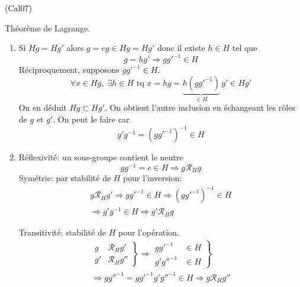 \begin{tiny}(Cal07)\end{tiny} Théorème de Lagrange.
\begin{enumerate}
  \item Si $Hg = Hg'$ alors $g=eg\in Hg=Hg'$ donc il existe $h\in H$ tel que
\begin{displaymath}
  g = h g' \Rightarrow gg'^{-1} \in H
\end{displaymath}
Réciproquement, supposons $gg'^{-1} \in H$.
\begin{displaymath}
  \forall x \in Hg,\; \exists h\in H\text{ tq } x = hg = \underset{\in H}{\underbrace{h(gg'^{-1})}}\,g' \in Hg'
\end{displaymath}
On en déduit $Hg \subset Hg'$.\newline
On obtient l'autre inclusion en échangeant les rôles de $g$ et $g'$. On peut le faire car 
\begin{displaymath}
  g'g^{-1} = (gg'^{-1})^{-1} \in H
\end{displaymath}

  \item Réflexivité: un sous-groupe contient le neutre
\begin{displaymath}
gg^{-1}=e\in H  \Rightarrow g \mathcal{R}_H g
\end{displaymath}
Symétrie: par stabilité de $H$ pour l'inversion:
\begin{multline*}
g \mathcal{R}_H g' \Rightarrow gg'^{-1} \in H \Rightarrow (gg'^{-1})^{-1} \in H\\
\Rightarrow g'g^{-1} \in H \Rightarrow g' \mathcal{R}_H g
\end{multline*}

Transitivité: stabilité de $H$ pour l'opération.
\begin{multline*}
\left. 
\begin{aligned}
g &\mathcal{R}_H g' \\ g' &\mathcal{R}_H g''  
\end{aligned}
\right\rbrace \Rightarrow
\left. 
\begin{aligned}
gg'^{-1} &\in H \\ g'g''^{-1} &\in H  
\end{aligned}
\right\rbrace \\
\Rightarrow
gg''^{-1} = gg'^{-1}  g'g''^{-1} \in H 
\Rightarrow g \mathcal{R}_H g''
\end{multline*}


\end{enumerate}
